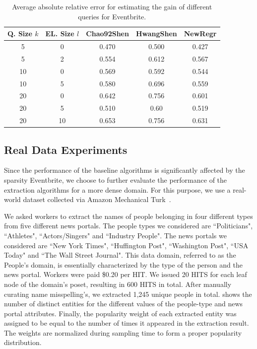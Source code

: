 \begin{table}
\small\center
\caption{Average absolute relative error for estimating the gain of different queries for Eventbrite.}
\label{tab:eventesterror}
\begin{tabular}{|c|c|c|c|c|}
\hline
\textbf{Q. Size $k$} & \textbf{EL. Size $l$} & \textbf{Chao92Shen} & \textbf{HwangShen} & \textbf{NewRegr} \\ \hline
5 & 0 & 0.470 & 0.500 & 0.427 \\
5 & 2 & 0.554 & 0.612 & 0.567\\
10 & 0 & 0.569 & 0.592 & 0.544\\
10 & 5 & 0.580 & 0.696 & 0.559\\
20 & 0 & 0.642 & 0.756 &0.601\\
20 & 5 & 0.510 & 0.60 & 0.519 \\
20 & 10 & 0.653 & 0.756 & 0.631\\
\hline
\end{tabular}
\vspace{-10pt}
\end{table}

\subsection{Real Data Experiments}
\label{sec:realdata}
Since the performance of the baseline algorithms is significantly affected by the sparsity Eventbrite, we choose to further evaluate the performance of the extraction algorithms for a more dense domain. For this purpose, we use a real-world dataset collected via Amazon Mechanical Turk~\cite{mturk}. 

We asked workers to extract the names of people belonging in four different types from five different news portals. The people types we considered are ``Politicians", ``Athletes", ``Actors/Singers" and ``Industry People". The news portals we considered are ``New York Times", ``Huffington Post", ``Washington Post", ``USA  Today" and ``The Wall Street Journal". This data domain, referred to as the People's domain, is essentially characterized by the type of the person and the news portal. Workers were paid \$0.20 per HIT. We issued 20 HITS for each leaf node of the domain's poset, resulting in 600 HITS in total. After manually curating name misspelling's, we extracted 1,245 unique people in total.  shows the number of distinct entities for the different values of the people-type and news portal attributes. Finally, the popularity weight of each extracted entity was assigned to be equal to the number of times it appeared in the extraction result. The weights are normalized during sampling time to form a proper popularity distribution.


